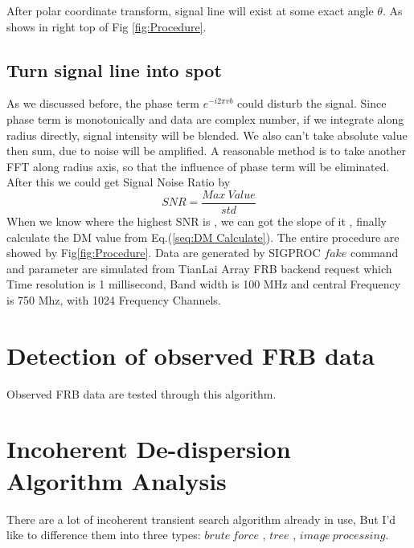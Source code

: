 \documentclass[iop]{emulateapj}
\begin{document}
 After polar coordinate transform, signal line will exist at some exact angle $\theta$. As shows in right top of Fig \ref{fig:Procedure}. 

\subsection{Turn signal line into spot}
As we discussed before, the phase term $e^{-i2\pi vb}$ could disturb the signal. Since phase term is monotonically and data are complex number, if we integrate along radius directly, signal intensity will be blended. We also can't take absolute value then sum,  due to noise will be amplified. A reasonable method is to take another FFT along radius axis, so that the influence of phase term will be eliminated.
After this we could get Signal Noise Ratio by 
\begin{equation*}
SNR = \frac{Max~Value }{std}
\end{equation*}
When we know where the highest SNR is , we can got the slope of it , finally calculate the DM value from Eq.(\ref{seq:DM Calculate}). 
The entire procedure are showed by Fig\ref{fig:Procedure}. Data are generated by SIGPROC $fake$ command and parameter are simulated from TianLai Array FRB backend request which Time resolution is 1 millisecond, Band width is 100 MHz and central Frequency is 750 Mhz,  with 1024 Frequency Channels.




\section{Detection of observed FRB data}
Observed FRB data are tested through this algorithm. 

\section{Incoherent De-dispersion Algorithm Analysis}
There are a lot of incoherent transient search algorithm already in use, But I'd like to difference them into three types: $brute~force$ , $tree$ ,  $image~processing$. \\

\end{document}
